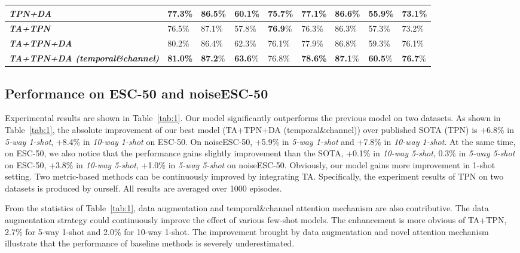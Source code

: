 \documentclass[a4paper]{article}
\begin{document}
\begin{table}[t]
{\begin{tabular}{l|l|l|l|l|l|l|l|l}
		\midrule
		{\textbf{\textit{TPN+DA}}} & 77.3\%  & 86.5\%  & 60.1\%  & 75.7\% & 77.1\% & 86.6\% & 55.9\%  & 73.1\%  \\
		\midrule
		{\textbf{\textit{TA+TPN}}} & 76.5\%  & 87.1\%  & 57.8\%  & \textbf{76.9}\% & 76.3\% & 86.3\% & 57.3\%  & 73.2\%  \\
		\midrule
		{\textbf{\textit{TA+TPN+DA}}} & 80.2\%  & 86.4\%  & 62.3\%  & 76.1\% & 77.9\%  & 86.8\%  & 59.3\%  & 76.1\%  \\
		\midrule
		{\textbf{\textit{TA+TPN+DA (temporal\&channel)}}} & \textbf{81.0\%}  & \textbf{87.2}\%  & \textbf{63.6}\%  & 76.8\% & \textbf{78.6\%}  & \textbf{87.1}\%  & \textbf{60.5}\%  & \textbf{76.7}\%  \\
		\bottomrule
		\end{tabular}
	}
\vspace{-5mm}
\end{table}

\vspace{-1.5mm}
\subsection{Performance on ESC-50 and noiseESC-50}
\vspace{-1.5mm}
Experimental results are shown in Table~\ref{tab:1}. Our model significantly outperforms the previous model on two datasets. As shown in Table~\ref{tab:1}, the absolute improvement of our best model (TA+TPN+DA (temporal\&channel)) over published SOTA (TPN) is +6.8\% in \textit{5-way 1-shot}, +8.4\% in \textit{10-way 1-shot} on ESC-50. On noiseESC-50, +5.9\% in \textit{5-way 1-shot} and +7.8\% in \textit{10-way 1-shot}.
At the same time, on ESC-50, we also notice that the performance gains slightly improvement than the SOTA, +0.1\% in \textit{10-way 5-shot}, 0.3\% in \textit{5-way 5-shot} on ESC-50, +3.8\% in \textit{10-way 5-shot}, +1.0\% in \textit{5-way 5-shot} on noiseESC-50.
Obviously, our model gains more improvement in 1-shot setting. Two metric-based methods can be continuously improved by integrating TA.
Specifically, the experiment results of TPN on two datasets is produced by ourself. All results are averaged over 1000 episodes.

From the statistics of Table~\ref{tab:1}, data augmentation 
and temporal\&channel attention mechanism are also contributive. 
The data augmentation strategy could continuously improve the effect of various few-shot models. The enhancement is more obvious of TA+TPN, 2.7\% for 5-way 1-shot and 2.0\% for 10-way 1-shot. The improvement brought by data augmentation and novel attention mechanism illustrate that the performance of baseline methods is severely underestimated.
\vspace{-3mm}
\end{document}
